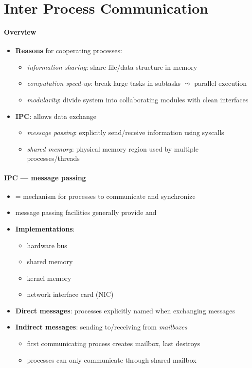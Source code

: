 \section{Inter Process Communication}

\paragraph{Overview}
\begin{itemize}
  \item \textbf{Reasons} for cooperating processes:
  \begin{itemize}
    \item \emph{information sharing}: share file/data-structure in memory
    \item \emph{computation speed-up}: break large tasks in subtasks \( \leadsto \) parallel execution
    \item \emph{modularity}: divide system into collaborating modules with clean interfaces
  \end{itemize}
  \item \textbf{IPC}: allows data exchange
  \begin{itemize}
    \item \emph{message passing}: explicitly send/receive information using syscalls
    \item \emph{shared memory}: physical memory region used by multiple processes/threads
  \end{itemize}
\end{itemize}

\paragraph{IPC --- message passing}
\begin{itemize}
  \item = mechanism for processes to communicate and synchronize
  \item message passing facilities generally provide  and 
  \item \textbf{Implementations}:
  \begin{itemize}
    \item hardware bus
    \item shared memory
    \item kernel memory
    \item network interface card (NIC)
  \end{itemize}
  \item \textbf{Direct messages}: processes explicitly named when exchanging messages
  \item \textbf{Indirect messages}: sending to/receiving from \emph{mailboxes}
  \begin{itemize}
    \item first communicating process creates mailbox, last destroys
    \item processes can only communicate through shared mailbox
  \end{itemize}
\end{itemize}

